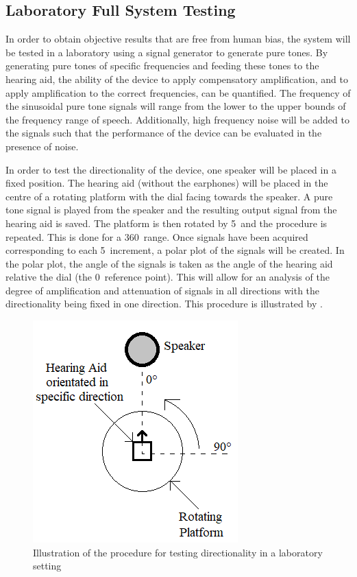 \documentclass[10pt,twocolumn]{witseiepaper}
\begin{document}
\subsection{Laboratory Full System Testing} \label{sec:laboratory}
In order to obtain objective results that are free from human bias, the system will be tested in a laboratory using a signal generator to generate pure tones. By generating pure tones of specific frequencies and feeding these tones to the hearing aid, the ability of the device to apply compensatory amplification, and to apply amplification to the correct frequencies, can be quantified. The frequency of the sinusoidal pure tone signals will range from the lower to the upper bounds of the frequency range of speech. Additionally, high frequency noise will be added to the signals such that the performance of the device can be evaluated in the presence of noise.

In order to test the directionality of the device, one speaker will be placed in a fixed position. The hearing aid (without the earphones) will be placed in the centre of a rotating platform with the dial facing towards the speaker. A pure tone signal is played from the speaker and the resulting output signal from the hearing aid is saved. The platform is then rotated by 5\textdegree\ and the procedure is repeated. This is done for a 360\textdegree\ range. Once signals have been acquired corresponding to each 5\textdegree\ increment, a polar plot of the signals will be created. In the polar plot, the angle of the signals is taken as the angle of the hearing aid relative the dial (the 0\textdegree\ reference point). This will allow for an analysis of the degree of amplification and attenuation of signals in all directions with the directionality being fixed in one direction. This procedure is illustrated by .

\begin{figure}[h]
	\centering
	\includegraphics[width=0.7\columnwidth]{directionalityLabTest.png}
	\caption{Illustration of the procedure for testing directionality in a laboratory setting}
	\raggedright
	\label{fig:directionalityLab}	
\end{figure}
\end{document}
